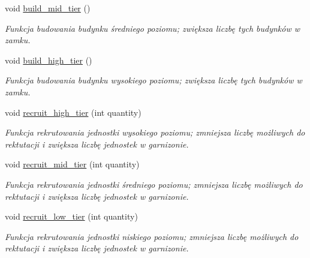 \begin{DoxyCompactItemize}
\mbox{\label{classmodel_1_1Castle_a59e4a67ca637be7f4624915e514e761f}} 
void \hyperlink{classmodel_1_1Castle_a59e4a67ca637be7f4624915e514e761f}{build\+\_\+mid\+\_\+tier} ()
\begin{DoxyCompactList}\small\item\em Funkcja budowania budynku średniego poziomu; zwiększa liczbę tych budynków w zamku. \end{DoxyCompactList}\item 
\mbox{\label{classmodel_1_1Castle_a89497c4fa84a2264329d36683d5d15d1}} 
void \hyperlink{classmodel_1_1Castle_a89497c4fa84a2264329d36683d5d15d1}{build\+\_\+high\+\_\+tier} ()
\begin{DoxyCompactList}\small\item\em Funkcja budowania budynku wysokiego poziomu; zwiększa liczbę tych budynków w zamku. \end{DoxyCompactList}\item 
\mbox{\label{classmodel_1_1Castle_a35900af063f73ccb135e66796c48e383}} 
void \hyperlink{classmodel_1_1Castle_a35900af063f73ccb135e66796c48e383}{recruit\+\_\+high\+\_\+tier} (int quantity)
\begin{DoxyCompactList}\small\item\em Funkcja rekrutowania jednostki wysokiego poziomu; zmniejsza liczbę możliwych do rektutacji i zwiększa liczbę jednostek w garnizonie. \end{DoxyCompactList}\item 
\mbox{\label{classmodel_1_1Castle_a8b8a25ca83a7c8d935bc3892109abe6f}} 
void \hyperlink{classmodel_1_1Castle_a8b8a25ca83a7c8d935bc3892109abe6f}{recruit\+\_\+mid\+\_\+tier} (int quantity)
\begin{DoxyCompactList}\small\item\em Funkcja rekrutowania jednostki średniego poziomu; zmniejsza liczbę możliwych do rektutacji i zwiększa liczbę jednostek w garnizonie. \end{DoxyCompactList}\item 
\mbox{\label{classmodel_1_1Castle_aa80ab7329c7db0de69ecfa1ab4ed8e17}} 
void \hyperlink{classmodel_1_1Castle_aa80ab7329c7db0de69ecfa1ab4ed8e17}{recruit\+\_\+low\+\_\+tier} (int quantity)
\begin{DoxyCompactList}\small\item\em Funkcja rekrutowania jednostki niskiego poziomu; zmniejsza liczbę możliwych do rektutacji i zwiększa liczbę jednostek w garnizonie. \end{DoxyCompactList}\item 

\end{DoxyCompactItemize}

